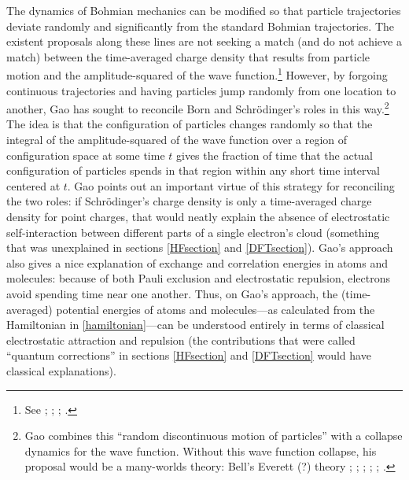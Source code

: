 \documentclass[12pt,onecolumn,secnumarabic,amsmath,amssymb,balancelastpage,nofootinbib]{article}
\begin{document}
The dynamics of Bohmian mechanics can be modified so that particle trajectories deviate randomly and significantly from the standard Bohmian trajectories.  The existent proposals along these lines are not seeking a match (and do not achieve a match) between the time-averaged charge density that results from particle motion and the amplitude-squared of the wave function.\footnote{See \cite{nelson1985, goldstein1987, bohmhiley1989}; \cite[pg.\ 645]{nelson1990}; \cite{bacciagaluppi1999}; \cite[footnote 5]{gao2018}.}  However, by forgoing continuous trajectories and having particles jump randomly from one location to another, Gao \cite{gao2014, gao2017, gao2018, gao2020} has sought to reconcile Born and Schr\"{o}dinger's roles in this way.\footnote{Gao \cite[ch.\ 8]{gao2017} combines this ``random discontinuous motion of particles'' with a collapse dynamics for the wave function.  Without this wave function collapse, his proposal would be a many-worlds theory: Bell's Everett (?) theory \cite{bell1981}; \cite[sec.\ 5.1]{barrett1999}; \cite[sec.\ 6.2]{allori2008}; \cite[sec.\ 4]{allori2011}; \cite{maudlin2016}; \cite[ch.\ 8]{gao2017}.}  The idea is that the configuration of particles changes randomly so that the integral of the amplitude-squared of the wave function over a region of configuration space at some time $t$ gives the fraction of time that the actual configuration of particles spends in that region within any short time interval centered at $t$.  Gao points out an important virtue of this strategy for reconciling the two roles: if Schr\"{o}dinger's charge density is only a time-averaged charge density for point charges, that would neatly explain the absence of electrostatic self-interaction between different parts of a single electron's cloud (something that was unexplained in sections \ref{HFsection} and \ref{DFTsection}).  Gao's approach also gives a nice explanation of exchange and correlation energies in atoms and molecules: because of both Pauli exclusion and electrostatic repulsion, electrons avoid spending time near one another.  Thus, on Gao's approach, the (time-averaged) potential energies of atoms and molecules---as calculated from the Hamiltonian in \eqref{hamiltonian}---can be understood entirely in terms of classical electrostatic attraction and repulsion (the contributions that were called ``quantum corrections'' in sections \ref{HFsection} and \ref{DFTsection} would have classical explanations). 
\end{document}
